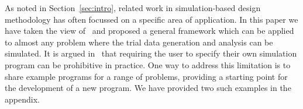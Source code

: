\documentclass{article} %
\begin{document}





As noted in Section~\ref{sec:intro}, related work in simulation-based design methodology has often focussed on a specific area of application. In this paper we have taken the view of~\cite{Hooper2013} and proposed a general framework which can be applied to almost any problem where the trial data generation and analysis can be simulated. It is argued in~\cite{Kontopantelis2016} that requiring the user to specify their own simulation program can be prohibitive in practice. One way to address this limitation is to share example programs for a range of problems, providing a starting point for the development of a new program. We have provided two such examples in the appendix.
\end{document}

